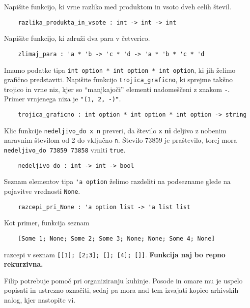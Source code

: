\documentclass[arhiv]{../izpit}
\begin{document}

\naloga

\podnaloga
Napišite funkcijo, ki vrne razliko med produktom in vsoto dveh celih števil.
\begin{verbatim}
    razlika_produkta_in_vsote : int -> int -> int
\end{verbatim}

\podnaloga
Napišite funkcijo, ki združi dva para v četverico.
\begin{verbatim}
    zlimaj_para : 'a * 'b -> 'c * 'd -> 'a * 'b * 'c * 'd
\end{verbatim}

\podnaloga
Imamo podatke tipa \verb|int option * int option * int option|, ki jih želimo grafično predstaviti. Napišite funkcijo \verb|trojica_graficno|, ki sprejme takšno trojico in vrne niz, kjer so ``manjkajoči'' elementi nadomeščeni z znakom \verb|-|. Primer vrnjenega niza je \verb|"(1, 2, -)"|.
\begin{verbatim}
    trojica_graficno : int option * int option * int option -> string
\end{verbatim}

\podnaloga
Klic funkcije \verb|nedeljivo_do x n| preveri, da število \verb|x| \textbf{ni} deljivo z nobenim naravnim številom od 2 do vključno \verb|n|. Število 73859 je praštevilo, torej mora \verb|nedeljivo_do 73859 73858| vrniti \verb|true|.
\begin{verbatim}
    nedeljivo_do : int -> int -> bool
\end{verbatim}

\podnaloga
Seznam elementov tipa \verb|'a option| želimo razdeliti na podsezname glede na pojavitve vrednosti \verb|None|.
\begin{verbatim}
    razcepi_pri_None : 'a option list -> 'a list list
\end{verbatim}
Kot primer, funkcija seznam
\begin{verbatim}
    [Some 1; None; Some 2; Some 3; None; None; Some 4; None]
\end{verbatim}
razcepi v seznam \verb|[[1]; [2;3]; []; [4]; []]|. \textbf{Funkcija naj bo repno rekurzivna.}


\naloga

Filip potrebuje pomoč pri organiziranju kuhinje. Posode in omare mu je uspelo popisati in ustrezno označiti, sedaj pa mora nad tem izvajati kopico arhivskih nalog, kjer nastopite vi.
\end{document}
